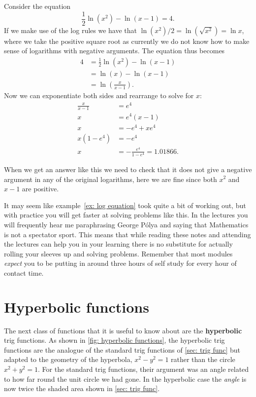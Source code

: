 \begin{ex}
\label{ex: log equation}
Consider the equation
\begin{equation*}
\frac{1}{2}\ln\left(x^{2}\right)-\ln\left(x-1\right)=4.
\end{equation*}
If we make use of the log rules we have that $\ln(x^{2})/2=\ln(\sqrt{x^{2}})=\ln x$, where we take the positive square root as currently we do not know how to make sense of logarithms with negative arguments. The equation thus becomes
\begin{align*}
4&=\frac{1}{2}\ln\left(x^{2}\right)-\ln\left(x-1\right)\\
&=\ln\left(x\right)-\ln\left(x-1\right)\\
&=\ln\left(\frac{x}{x-1}\right).
\end{align*}
Now we can exponentiate both sides and rearrange to solve for $x$:
\begin{align*}
\frac{x}{x-1}&=e^{4}\\
x&=e^{4}\left(x-1\right)\\
x&=-e^{4}+xe^{4}\\
x\left(1-e^{4}\right)&=-e^{4}\\
x&=-\frac{e^{4}}{1-e^{4}}=1.01866.
\end{align*}

When we get an answer like this we need to check that it does not give a negative argument in any of the original logarithms, here we are fine since both $x^{2}$ and $x-1$ are positive.

\end{ex}

It may seem like example~\ref{ex: log equation} took quite a bit of working out, but with practice you will get faster at solving problems like this. In the lectures you will frequently hear me paraphrasing George P\'{o}lya and saying that Mathematics is not a spectator sport. This means that while reading these notes and attending the lectures can help you in your learning there is no substitute for actually rolling your sleeves up and solving problems. Remember that most modules \textit{expect} you to be putting in around three hours of self study for every hour of contact time.

\section{Hyperbolic functions}
\label{sec: hyperbolic functions}
The next class of functions that it is useful to know about are the \textbf{hyperbolic} trig functions. As shown in \cref{fig: hyperbolic functions}, the hyperbolic trig functions are the analogue of the standard trig functions of \cref{sec: trig func} but adapted to the geometry of the hyperbola, $x^{2}-y^{2}=1$ rather than the circle $x^{2}+y^{2}=1$. For the standard trig functions, their argument was an angle related to how far round the unit circle we had gone. In the hyperbolic case the \textit{angle} is now twice the shaded area shown in \cref{sec: trig func}. \\

